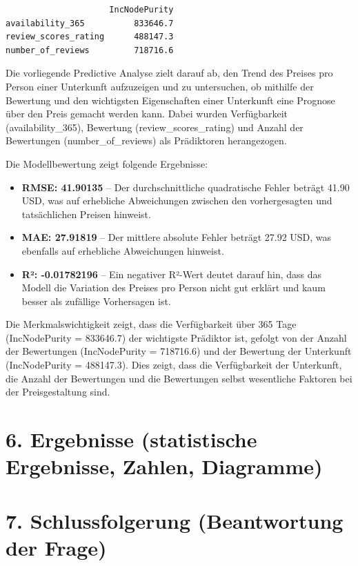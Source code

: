 \documentclass[
  journal,
]{IEEEtran}%
\begin{document}
\begin{verbatim}
                     IncNodePurity
availability_365          833646.7
review_scores_rating      488147.3
number_of_reviews         718716.6
\end{verbatim}

Die vorliegende Predictive Analyse zielt darauf ab, den Trend des
Preises pro Person einer Unterkunft aufzuzeigen und zu untersuchen, ob
mithilfe der Bewertung und den wichtigsten Eigenschaften einer
Unterkunft eine Prognose über den Preis gemacht werden kann. Dabei
wurden Verfügbarkeit (availability\_365), Bewertung
(review\_scores\_rating) und Anzahl der Bewertungen
(number\_of\_reviews) als Prädiktoren herangezogen.

Die Modellbewertung zeigt folgende Ergebnisse:

\begin{itemize}
\item
  \textbf{RMSE: 41.90135} -- Der durchschnittliche quadratische Fehler
  beträgt 41.90 USD, was auf erhebliche Abweichungen zwischen den
  vorhergesagten und tatsächlichen Preisen hinweist.
\item
  \textbf{MAE: 27.91819} -- Der mittlere absolute Fehler beträgt 27.92
  USD, was ebenfalls auf erhebliche Abweichungen hinweist.
\item
  \textbf{R²: -0.01782196} -- Ein negativer R²-Wert deutet darauf hin,
  dass das Modell die Variation des Preises pro Person nicht gut erklärt
  und kaum besser als zufällige Vorhersagen ist.
\end{itemize}

Die Merkmalswichtigkeit zeigt, dass die Verfügbarkeit über 365 Tage
(IncNodePurity = 833646.7) der wichtigste Prädiktor ist, gefolgt von der
Anzahl der Bewertungen (IncNodePurity = 718716.6) und der Bewertung der
Unterkunft (IncNodePurity = 488147.3). Dies zeigt, dass die
Verfügbarkeit der Unterkunft, die Anzahl der Bewertungen und die
Bewertungen selbst wesentliche Faktoren bei der Preisgestaltung sind.

\hypertarget{ergebnisse-statistische-ergebnisse-zahlen-diagramme}{%
\section{6. Ergebnisse (statistische Ergebnisse, Zahlen,
Diagramme)}\label{ergebnisse-statistische-ergebnisse-zahlen-diagramme}}

\hypertarget{schlussfolgerung-beantwortung-der-frage}{%
\section{7. Schlussfolgerung (Beantwortung der
Frage)}\label{schlussfolgerung-beantwortung-der-frage}}
\end{document}
